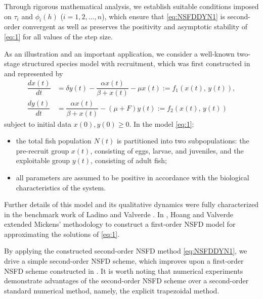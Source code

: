 \documentclass[12pt]{article}
\theoremstyle{definition}
\theoremstyle{remark}
\numberwithin{equation}{section}
\begin{document}
Through rigorous mathematical analysis, we establish suitable conditions imposed on $\tau_i$ and $\phi_i(h)$ ($i =1, 2, \ldots, n$), which ensure that \eqref{eq:NSFDDYN1} is second-order convergent as well as preserves the positivity and asymptotic stability of \eqref{eq:1} for all values of the step size.   


As an illustration and an important application, we consider a well-known two-stage structured species model with recruitment, which was first constructed in \cite{Ladino} and represented by
\begin{equation}\label{eq:1}
\begin{split}
\dfrac{dx(t)}{dt} &= \delta y(t)-\dfrac{\alpha x(t)}{\beta + x(t)}-\mu x(t) := f_1(x(t),\,y(t)),\\
\dfrac{dy(t)}{dt} &= \dfrac{\alpha x(t)}{\beta + x(t)}-(\mu+F) y(t) := f_2(x(t),\,y(t))
\end{split}
\end{equation}
subject to initial data $x(0), y(0) \geq 0$. In the model \eqref{eq:1}:
\begin{itemize}
\item the total fish population $N(t)$ is partitioned into two subpopulations: the pre-recruit group $x(t)$, consisting of eggs, larvae, and juveniles, and the exploitable group $y(t)$, consisting of adult fish;
\item all parameters are assumed to be positive in accordance with the biological characteristics of the system.
\end{itemize}
Further details of this model and its qualitative dynamics were fully characterized in the benchmark work of Ladino and Valverde \cite{Ladino}. In \cite{HoangValverde}, Hoang and Valverde extended Mickens' methodology \cite{Mickens1, Mickens2, Mickens3, Mickens4, Mickens5} to construct a first-order NSFD model for approximating the solutions of \eqref{eq:1}.


By applying the constructed second-order NSFD method  \eqref{eq:NSFDDYN1}, we drive a simple second-order NSFD scheme, which improves upon a first-order NSFD scheme constructed in \cite{HoangValverde}. It is worth noting that numerical experiments demonstrate advantages of the second-order NSFD scheme over a second-order standard numerical method, namely, the explicit trapezoidal method.
\end{document}
